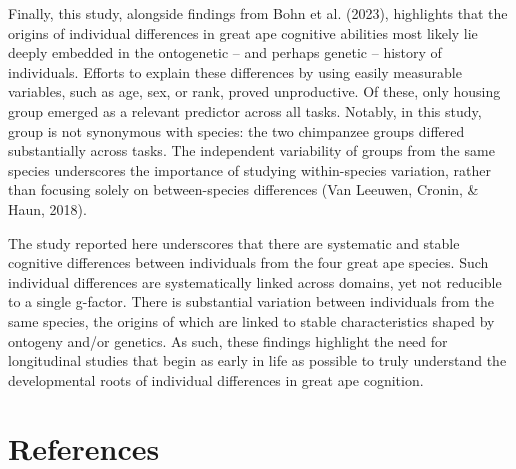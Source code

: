 \documentclass[
  man,floatsintext]{apa6}
\begin{document}
Finally, this study, alongside findings from Bohn et al. (2023), highlights that the origins of individual differences in great ape cognitive abilities most likely lie deeply embedded in the ontogenetic -- and perhaps genetic -- history of individuals. Efforts to explain these differences by using easily measurable variables, such as age, sex, or rank, proved unproductive. Of these, only housing group emerged as a relevant predictor across all tasks. Notably, in this study, group is not synonymous with species: the two chimpanzee groups differed substantially across tasks. The independent variability of groups from the same species underscores the importance of studying within-species variation, rather than focusing solely on between-species differences (Van Leeuwen, Cronin, \& Haun, 2018).

The study reported here underscores that there are systematic and stable cognitive differences between individuals from the four great ape species. Such individual differences are systematically linked across domains, yet not reducible to a single g-factor. There is substantial variation between individuals from the same species, the origins of which are linked to stable characteristics shaped by ontogeny and/or genetics. As such, these findings highlight the need for longitudinal studies that begin as early in life as possible to truly understand the developmental roots of individual differences in great ape cognition.

\newpage

\section{References}\label{references}
\end{document}
